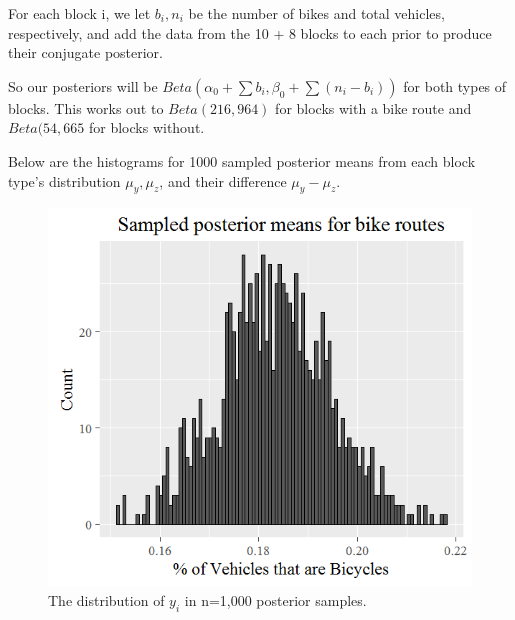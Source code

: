 \documentclass{article}
\begin{document}
For each block i, we let \(b_i, n_i\) be the number of bikes and total vehicles, respectively,
and add the data from the 10 + 8 blocks to each prior to produce their conjugate posterior.

So our posteriors will be \(Beta(\alpha_0 + \sum b_i,  \beta_0 + \sum (n_i - b_i))\) for both types
of blocks. This works out to
\(Beta(216, 964)\) for blocks with a bike route and
\(Beta(54, 665\) for blocks without.

Below are the histograms for 1000 sampled posterior means from each
block type's distribution \(\mu_y, \mu_z\), and
their difference \(\mu_y - \mu_z\).

\begin{figure}[!ht]
  \caption{The distribution of 
  \(y_i\) in n=1,000 posterior samples.}
  \centering
    \includegraphics[width=\textwidth]{Problem38y}
\end{figure}    
\end{document}
